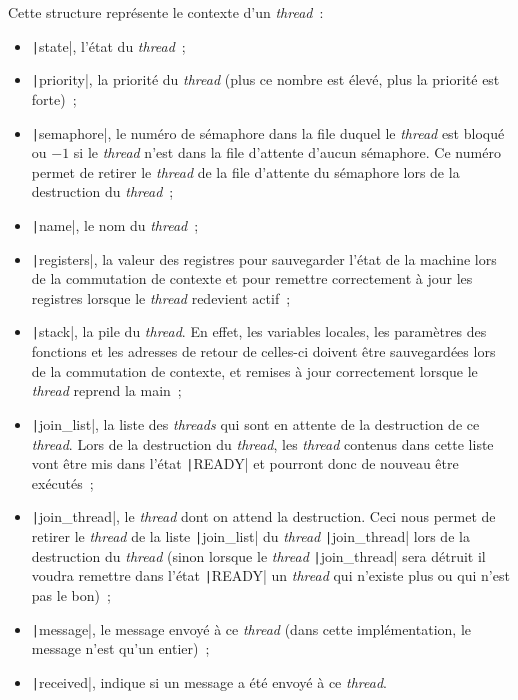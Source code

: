 \documentclass[a4paper]{article}
\begin{document}
Cette structure représente le contexte d'un \emph{thread}~:\\
\begin{itemize}
\item \texttt|state|, l'état du \emph{thread}~;\\
\item \texttt|priority|, la priorité du \emph{thread} (plus ce nombre est élevé, plus la priorité est forte)~;\\
\item \texttt|semaphore|, le numéro de sémaphore dans la file duquel le \emph{thread} est bloqué ou $-1$ si le \emph{thread} n'est dans la
file d'attente d'aucun sémaphore. Ce numéro permet de retirer le \emph{thread} de la file 
d'attente du sémaphore lors de la destruction du \emph{thread}~;\\
\item \texttt|name|, le nom du \emph{thread}~;\\
\item \texttt|registers|, la valeur des registres pour sauvegarder l'état de la machine lors de la commutation de contexte et pour 
remettre correctement à jour les registres lorsque le \emph{thread} redevient actif~;\\
\item \texttt|stack|, la pile du \emph{thread}. En effet, les variables locales, les paramètres des fonctions et les adresses de retour de celles-ci doivent être sauvegardées lors de la commutation de contexte, et remises à jour correctement lorsque le \emph{thread} reprend la main~;\\
\item \texttt|join_list|, la liste des \emph{threads} qui sont en attente de la destruction de ce \emph{thread}. Lors de la destruction du \emph{thread},
les \emph{thread} contenus dans cette liste vont être mis dans
l'état \texttt|READY| et pourront donc de nouveau être exécutés~;\\
\item \texttt|join_thread|, le \emph{thread} dont on attend la destruction. Ceci nous permet de retirer le \emph{thread} de la liste \texttt|join_list|
du \emph{thread} \texttt|join_thread| lors de la destruction du \emph{thread} (sinon lorsque le \emph{thread} \texttt|join_thread| sera détruit il voudra
remettre dans l'état \texttt|READY| un \emph{thread} qui n'existe plus ou qui n'est pas le bon)~;\\
\item \texttt|message|, le message envoyé à ce \emph{thread} (dans cette implémentation, le message n'est qu'un entier)~;\\
\item \texttt|received|, indique si un message a été envoyé à ce \emph{thread}.\\
\end{itemize}
\end{document}
